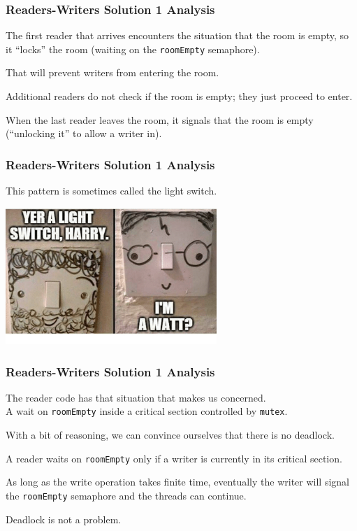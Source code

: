 \begin{frame}
\frametitle{Readers-Writers Solution 1 Analysis}

The first reader that arrives encounters the situation that the room is empty, so it ``locks'' the room (waiting on the \texttt{roomEmpty} semaphore).

That will prevent writers from entering the room. 

Additional readers do not check if the room is empty; they just proceed to enter. 

When the last reader leaves the room, it signals that the room is empty (``unlocking it'' to allow a writer in). 

\end{frame}

\begin{frame}
\frametitle{Readers-Writers Solution 1 Analysis}

This pattern is sometimes called the \alert{light switch}.

\begin{center}
	\includegraphics[width=0.6\textwidth]{images/lightswitch.png}
\end{center}

\end{frame}


\begin{frame}
\frametitle{Readers-Writers Solution 1 Analysis}

The reader code has that situation that makes us concerned.\\
\quad A wait on \texttt{roomEmpty} inside a critical section controlled by \texttt{mutex}. 

With a bit of reasoning, we can convince ourselves that there is no deadlock.

A reader waits on \texttt{roomEmpty} only if a writer is currently in its critical section.

As long as the write operation takes finite time, eventually the writer will signal the \texttt{roomEmpty} semaphore and the threads can continue. 

Deadlock is not a problem.

\end{frame}


